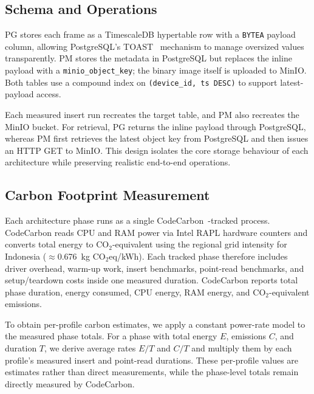 \documentclass[conference]{IEEEtran}
\begin{document}
\subsection{Schema and Operations}
PG stores each frame as a TimescaleDB hypertable row with a \texttt{BYTEA} payload column, allowing PostgreSQL's TOAST~\cite{postgresql_toast_docs} mechanism to manage oversized values transparently. PM stores the metadata in PostgreSQL but replaces the inline payload with a \texttt{minio\_object\_key}; the binary image itself is uploaded to MinIO. Both tables use a compound index on \texttt{(device\_id, ts DESC)} to support latest-payload access.

Each measured insert run recreates the target table, and PM also recreates the MinIO bucket. For retrieval, PG returns the inline payload through PostgreSQL, whereas PM first retrieves the latest object key from PostgreSQL and then issues an HTTP GET to MinIO. This design isolates the core storage behaviour of each architecture while preserving realistic end-to-end operations.

\subsection{Carbon Footprint Measurement}
Each architecture phase runs as a single CodeCarbon~\cite{codecarbon}-tracked process. CodeCarbon reads CPU and RAM power via Intel RAPL hardware counters and converts total energy to CO$_2$-equivalent using the regional grid intensity for Indonesia ($\approx$0.676~kg CO$_2$eq/kWh). Each tracked phase therefore includes driver overhead, warm-up work, insert benchmarks, point-read benchmarks, and setup/teardown costs inside one measured duration. CodeCarbon reports total phase duration, energy consumed, CPU energy, RAM energy, and CO$_2$-equivalent emissions.

To obtain per-profile carbon estimates, we apply a constant power-rate model to the measured phase totals. For a phase with total energy $E$, emissions $C$, and duration $T$, we derive average rates $E/T$ and $C/T$ and multiply them by each profile's measured insert and point-read durations. These per-profile values are estimates rather than direct measurements, while the phase-level totals remain directly measured by CodeCarbon.
\end{document}

